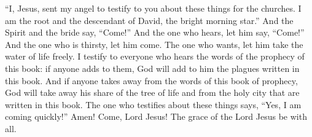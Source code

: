 \begin{biblechapter}
\verse “I, Jesus, sent my angel to testify to you about these things for the churches. I am the root and the descendant of David, the bright morning star.”
 And the Spirit and the bride say, “Come!” And the one who hears, let him say, “Come!” And the one who is thirsty, let him come. The one who wants, let him take the water of life freely.
 I testify to everyone who hears the words of the prophecy of this book: if anyone adds to them, God will add to him the plagues written in this book.
\verse And if anyone takes away from the words of this book of prophecy, God will take away his share of the tree of life and from the holy city that are written in this book.
\verse The one who testifies about these things says, “Yes, I am coming quickly!” Amen! Come, Lord Jesus!
\verse The grace of the Lord Jesus be with all.
\end{biblechapter}

